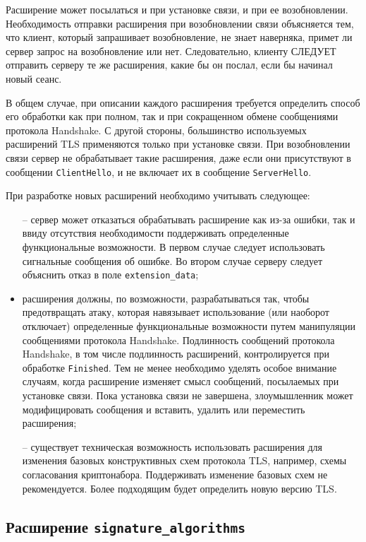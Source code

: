 Расширение может посылаться и при установке связи, и при ее возобновлении. 
Необходимость отправки расширения при возобновлении связи объясняется тем, 
что клиент, который запрашивает возобновление, не знает наверняка, примет 
ли сервер запрос на возобновление или нет. Следовательно, клиенту СЛЕДУЕТ 
отправить серверу те же расширения, какие бы он послал, если бы начинал 
новый сеанс. 

В общем случае, при описании каждого расширения требуется определить способ
его обработки как при полном, так и при сокращенном обмене сообщениями
протокола Handshake. С другой стороны, большинство используемых
расширений TLS применяются только при установке связи. При возобновлении
связи сервер не обрабатывает такие расширения, даже если они присутствуют в
сообщении \lstinline{ClientHello}, и не включает их в сообщение
\lstinline{ServerHello}.

При разработке новых расширений необходимо учитывать следующее:
\begin{itemize}
\item[--] 
сервер может отказаться обрабатывать расширение как из-за ошибки, 
так и ввиду отсутствия необходимости поддерживать определенные 
функциональные возможности. В первом случае следует использовать 
сигнальные сообщения об ошибке. Во втором случае серверу следует объяснить 
отказ в поле \lstinline{extension_data}; 

\item[--]
расширения должны, по возможности, разрабатываться так, чтобы 
предотвращать атаку, которая навязывает использование (или наоборот 
отключает) определенные функциональные возможности путем манипуляции 
сообщениями протокола Handshake. Подлинность сообщений протокола 
Handshake, в том числе подлинность расширений, контролируется при 
обработке \lstinline{Finished}. Тем не менее необходимо 
уделять особое внимание случаям, когда расширение изменяет смысл 
сообщений, посылаемых при установке связи. Пока установка связи не 
завершена, злоумышленник может модифицировать сообщения и вставить, 
удалить или переместить расширения;  

\item[--]
существует техническая возможность использовать расширения для 
изменения базовых конструктивных схем протокола TLS, например, схемы 
согласования криптонабора. Поддерживать изменение базовых схем не 
рекомендуется. Более подходящим будет определить новую версию TLS. 
\end{itemize}

\subsection{Расширение \lstinline{signature_algorithms}}\label{HANDSHAKE.7.1}

